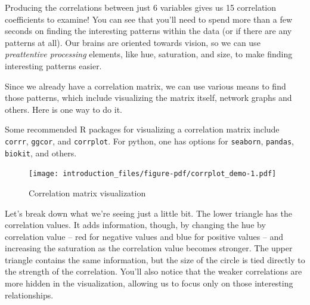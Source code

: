 \documentclass[
  letterpaper,
]{krantz}
\begin{document}
Producing the correlations between just 6 variables gives us 15
correlation coefficients to examine! You can see that you'll need to
spend more than a few seconds on finding the interesting patterns within
the data (or if there are any patterns at all). Our brains are oriented
towards vision, so we can use \emph{preattentive processing} elements,
like hue, saturation, and size, to make finding interesting patterns
easier.

Since we already have a correlation matrix, we can use various means to
find those patterns, which include visualizing the matrix itself,
network graphs and others. Here is one way to do it.

\begin{tcolorbox}[enhanced jigsaw, toprule=.15mm, colback=white, breakable, rightrule=.15mm, arc=.35mm, bottomrule=.15mm, opacityback=0, colframe=quarto-callout-note-color-frame, leftrule=.75mm, left=2mm]
\begin{minipage}[t]{5.5mm}
\textcolor{quarto-callout-note-color}{\faInfo}
\end{minipage}%
\begin{minipage}[t]{\textwidth - 5.5mm}

Some recommended R packages for visualizing a correlation matrix include
\texttt{corrr}, \texttt{ggcor}, and \texttt{corrplot}. For python, one
has options for \texttt{seaborn}, \texttt{pandas}, \texttt{biokit}, and
others.

\end{minipage}%
\end{tcolorbox}

\begin{figure}

{\centering \texttt{[image: introduction\_files/figure-pdf/corrplot\_demo-1.pdf]}

}

\caption{Correlation matrix visualization}

\end{figure}

Let's break down what we're seeing just a little bit. The lower triangle
has the correlation values. It adds information, though, by changing the
hue by correlation value -- red for negative values and blue for
positive values -- and increasing the saturation as the correlation
value becomes stronger. The upper triangle contains the same
information, but the size of the circle is tied directly to the strength
of the correlation. You'll also notice that the weaker correlations are
more hidden in the visualization, allowing us to focus only on those
interesting relationships.
\end{document}
